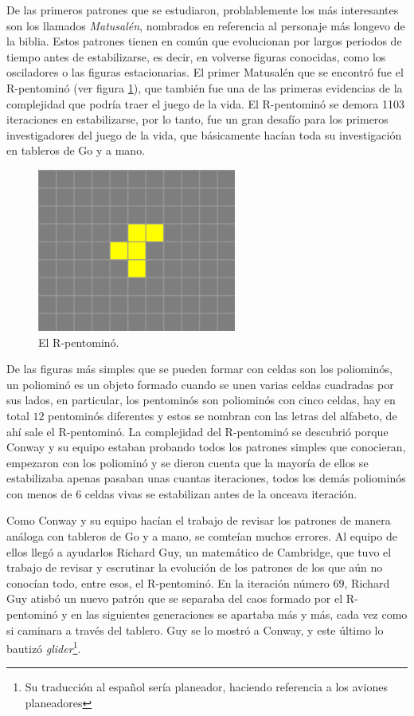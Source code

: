 De las primeros patrones que se estudiaron, problablemente los m\'as interesantes son los llamados \textit{Matusal\'en}, nombrados en referencia al personaje m\'as longevo de la biblia. Estos patrones tienen en com\'un que evolucionan por largos periodos de tiempo antes de estabilizarse, es decir, en volverse figuras conocidas, como los osciladores o las figuras estacionarias. El primer Matusal\'en que se encontr\'o fue el R-pentomin\'o (ver figura \ref{figure:pentomino-r}), que tambi\'en fue una de las primeras evidencias de la complejidad que podr\'ia traer el juego de la vida. El R-pentomin\'o se demora 1103 iteraciones en estabilizarse, por lo tanto, fue un gran desaf\'io para los primeros investigadores del juego de la vida, que b\'asicamente hac\'ian toda su investigaci\'on en tableros de Go y a mano.

\begin{figure}[h]
    \centering
    \includegraphics[width=.4\textwidth]{images/life-r-pentomino.png}
    \caption{El R-pentomin\'o.}
    \label{figure:pentomino-r}
\end{figure}

De las figuras m\'as simples que se pueden formar con celdas son los poliomin\'os, un poliomin\'o es un objeto formado cuando se unen varias celdas cuadradas por sus lados, en particular, los pentomin\'os son poliomin\'os con cinco celdas, hay en total $12$ pentomin\'os diferentes y estos se nombran con las letras del alfabeto, de ah\'i sale el R-pentomin\'o. La complejidad del R-pentomin\'o se descubri\'o porque Conway y su equipo estaban probando todos los patrones simples que conocieran, empezaron con los poliomin\'o y se dieron cuenta que la mayor\'ia de ellos se estabilizaba apenas pasaban unas cuantas iteraciones, todos los dem\'as poliomin\'os con menos de 6 celdas vivas se estabilizan antes de la onceava iteraci\'on. 

Como Conway y su equipo hac\'ian el trabajo de revisar los patrones de manera an\'aloga con tableros de Go y a mano, se comte\'ian muchos errores. Al equipo de ellos lleg\'o a ayudarlos Richard Guy, un matem\'atico de Cambridge, que tuvo el trabajo de revisar y escrutinar la evoluci\'on de los patrones de los que a\'un no conoc\'ian todo, entre esos, el R-pentomin\'o. En la iteraci\'on n\'umero $69$, Richard Guy atisb\'o un nuevo patr\'on que se separaba del caos formado por el R-pentomin\'o y en las siguientes generaciones se apartaba m\'as y m\'as, cada vez como si caminara a trav\'es del tablero. Guy se lo mostr\'o a Conway, y este \'ultimo lo bautiz\'o \textit{glider}\footnote{Su traducci\'on al espa\~nol ser\'ia planeador, haciendo referencia a los aviones planeadores}.

